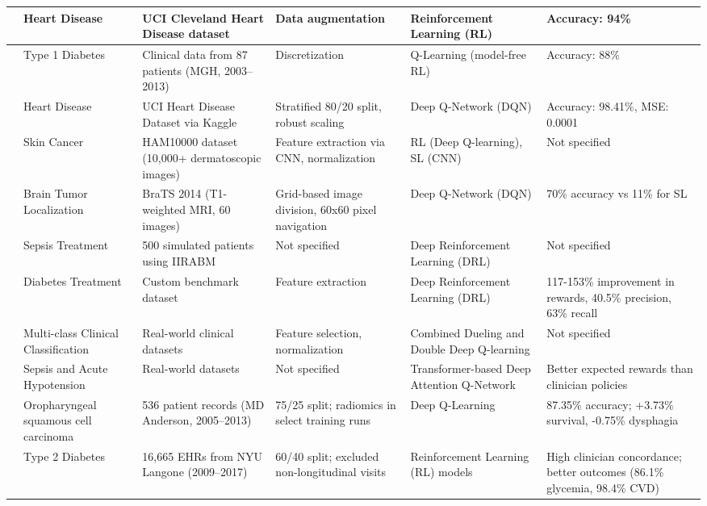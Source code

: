 \documentclass[10pt,a4paper]{article}
\begin{document}
\begin{table}[htbp]
\begin{adjustwidth}{-2cm}{-2cm}
\begin{tabular}{|p{1.5cm}|p{2.5cm}|p{3cm}|p{3.5cm}|p{2.5cm}|p{2.5cm}|}
\hline
\cite{gayathriEnhancingHeartDisease2024} & Heart Disease & UCI Cleveland Heart Disease dataset & Data augmentation & Reinforcement Learning (RL) & Accuracy: 94\% \\
\hline
\cite{javadReinforcementLearningBased2019} & Type 1 Diabetes & Clinical data from 87 patients (MGH, 2003--2013) & Discretization & Q-Learning (model-free RL) & Accuracy: 88\% \\
\hline
\cite{abdelazizDeepQNetworkDQN2025} & Heart Disease & UCI Heart Disease Dataset via Kaggle & Stratified 80/20 split, robust scaling & Deep Q-Network (DQN) & Accuracy: 98.41\%, MSE: 0.0001 \\
\hline
\cite{barataReinforcementLearningModel2023} & Skin Cancer & HAM10000 dataset (10,000+ dermatoscopic images) & Feature extraction via CNN, normalization & RL (Deep Q-learning), SL (CNN) & Not specified \\
\hline
\cite{stemberReinforcementLearningUsing2022} & Brain Tumor Localization & BraTS 2014 (T1-weighted MRI, 60 images) & Grid-based image division, 60x60 pixel navigation & Deep Q-Network (DQN) & 70\% accuracy vs 11\% for SL \\
\hline
\cite{petersenDeepReinforcementLearning2019} & Sepsis Treatment & 500 simulated patients using IIRABM & Not specified & Deep Reinforcement Learning (DRL) & Not specified \\
\hline
\cite{yangPrescDRLDeepReinforcement2024} & Diabetes Treatment & Custom benchmark dataset & Feature extraction & Deep Reinforcement Learning (DRL) & 117-153\% improvement in rewards, 40.5\% precision, 63\% recall \\
\hline
\cite{yangDeepReinforcementLearning2024} & Multi-class Clinical Classification & Real-world clinical datasets & Feature selection, normalization & Combined Dueling and Double Deep Q-learning & Not specified \\
\hline
\cite{maDeepAttentionQnetwork2023} & Sepsis and Acute Hypotension & Real-world datasets & Not specified & Transformer-based Deep Attention Q-Network & Better expected rewards than clinician policies \\
\hline
\cite{tardiniOptimalTreatmentSelection2022} & Oropharyngeal squamous cell carcinoma & 536 patient records (MD Anderson, 2005--2013) & 75/25 split; radiomics in select training runs & Deep Q-Learning & 87.35\% accuracy; +3.73\% survival, -0.75\% dysphagia \\
\hline
\cite{zhengPersonalizedMultimorbidityManagement2021} & Type 2 Diabetes & 16,665 EHRs from NYU Langone (2009--2017) & 60/40 split; excluded non-longitudinal visits & Reinforcement Learning (RL) models & High clinician concordance; better outcomes (86.1\% glycemia, 98.4\% CVD) \\

\end{tabular}
\end{adjustwidth}
\end{table}
\end{document}
